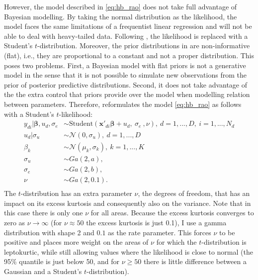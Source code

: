 However, the model described in \ref{eq:hb_rao} does not take full advantage of Bayesian modelling.
By taking the normal distribution as the likelihood, the model faces the same limitations of a frequentist linear regression and will not be able to deal with heavy-tailed data.
Following \cite{morelli_hierarchical_2021}, the likelihood is replaced with a Student's $t$-distribution.
Moreover, the prior distributions in \cite{molina_small_2014} are non-informative (flat), i.e., they are proportional to a constant and not a proper distribution.
This poses two problems.
First, a Bayesian model with flat priors is not a generative model in the sense that it is not possible to simulate new observations from the prior of posterior predictive distributions.
Second, it does not take advantage of the the extra control that priors provide over the model when modelling relation between parameters.
Therefore, \cite{morelli_hierarchical_2021} reformulates the model \ref{eq:hb_rao} as follows with a Student's $t$-likelihood:
\begin{equation}
	\begin{split}
		y_{di} |\boldsymbol \beta, u_d, \sigma_e & \sim
            \text{Student}(\boldsymbol{x'}_{di} \boldsymbol \beta + u_d,\ \sigma_e\ , \nu),\ d = 1, ..., D,\ i = 1, ..., N_d \\
		u_d | \sigma_u & \sim \mathcal N(0, \sigma_u),\ d = 1, ..., D \\
		\beta_k & \sim \mathcal N(\mu_k, \sigma_k),\ k = 1, ..., K\\
		\sigma_u & \sim Ga(2, a), \\
		\sigma_e & \sim Ga(2, b), \\
		\nu & \sim Ga(2, 0.1). \\
	\end{split}
	\label{eq:mod_hb}
\end{equation}
The $t$-distribution has an extra parameter $\nu$, the degrees of freedom, that has an impact on its excess kurtosis and consequently also on the variance.
Note that in this case there is only one $\nu$ for all areas.
Because the excess kurtosis converges to zero as $\nu \rightarrow \infty$  (for $\nu \approx 50$ the excess kurtosis is just 0.1), I use a gamma distribution with shape 2 and $0.1$ as the rate parameter.
This forces $\nu$ to be positive and places more weight on the areas of $\nu$ for which the $t$-distribution is leptokurtic, while still allowing values where the likelihood is close to normal (the 95\% quantile is just below 50, and for $\nu \ge 50$ there is little difference between a Gaussian and a Student's $t$-distribution).
